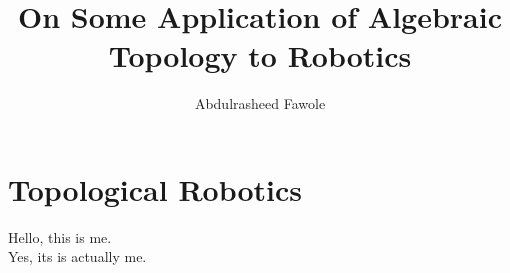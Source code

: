 \documentclass{scrartcl}
\title{On Some Application of Algebraic Topology to Robotics}
\author{Abdulrasheed Fawole}
\date{}
\begin{document}
\maketitle
\section{Topological Robotics}

Hello, this is me.\\
Yes, its is actually me.
\end{document}
